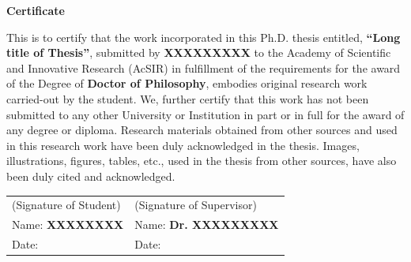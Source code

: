 \thispagestyle{plain}
\begin{center}
\fontsize{16pt}{24pt}\selectfont \textbf{Certificate}
\end{center}
\hline

\vspace{0.3cm}
\fontsize{12pt}{24pt}\selectfont

This is to certify that the work incorporated in this Ph.D. thesis entitled, \textbf{“Long title of Thesis”}, submitted by \textbf{XXXXXXXXX} to the Academy of Scientific and Innovative Research (AcSIR) in fulfillment of the requirements for the award of the Degree of \textbf{Doctor of Philosophy}, embodies original research work carried-out by the student. We, further certify that this work has not been submitted to any other University or Institution in part or in full for the award of any degree or diploma. Research materials obtained from other sources and used in this research work have been duly acknowledged in the thesis. Images, illustrations, figures, tables, etc., used in the thesis from other sources, have also been duly cited and acknowledged.

\vspace{3cm}
\begin{table}[h]
\centering
\fontsize{12pt}{18pt}\selectfont
\begin{tabular}{p{8.5cm}p{4.5cm}}
(Signature of Student) & (Signature of Supervisor)\\
Name: \textbf{XXXXXXXX} & Name: \textbf{Dr. XXXXXXXXX}\\
 
Date:  & Date: \\
\end{tabular}
\end{table}


